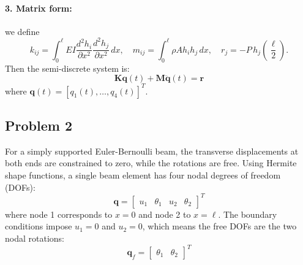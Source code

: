 \documentclass[12pt]{article}
\begin{document}
\paragraph{3. Matrix form:} we define
\[
    k_{ij} = \int_0^\ell EI \frac{d^2 h_i}{\partial x^2} \frac{d^2 h_j}{\partial x^2} \, dx, \quad
    m_{ij} = \int_0^\ell \rho A h_i h_j \, dx, \quad
    r_j = -P \, h_j\left( \frac{\ell}{2} \right).
\]
Then the semi-discrete system is:
\[
    \mathbf{K} \mathbf{q}(t) + \mathbf{M} \ddot{\mathbf{q}}(t) = \mathbf{r}
\]
where \( \mathbf{q}(t) = [q_1(t), \dots, q_4(t)]^T. \)

\subsection*{Problem 2}
For a simply supported Euler-Bernoulli beam, the transverse displacements at both ends are constrained to zero, while the rotations are free. Using Hermite shape functions, a single beam element has four nodal degrees of freedom (DOFs):
\[
    \mathbf{q} = \begin{bmatrix} u_1 & \theta_1 & u_2 & \theta_2 \end{bmatrix}^T
\]
where node 1 corresponds to \( x = 0 \) and node 2 to \( x = \ell \). The boundary conditions impose \( u_1 = 0 \) and \( u_2 = 0 \), which means the free DOFs are the two nodal rotations:
\[
    \mathbf{q}_f = \begin{bmatrix} \theta_1 & \theta_2 \end{bmatrix}^T
\]
\end{document}
